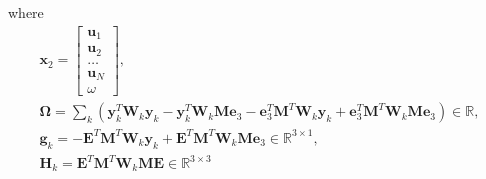 \documentclass{article}
\begin{document}
where
\begin{align}
    \mathbf{x}_2 = \begin{bmatrix} \mathbf{u}_1 \\ \mathbf{u}_2 \\ \dots \\ \mathbf{u}_N \\ \omega \end{bmatrix}, \\
    \mathbf{\Omega} = \sum_k \left( \mathbf{y}_k^T \mathbf{W}_k \mathbf{y}_k - \mathbf{y}_k^T \mathbf{W}_k \mathbf{M} \mathbf{e}_3 - \mathbf{e}_3^T \mathbf{M}^T \mathbf{W}_k \mathbf{y}_k + \mathbf{e}_3^T \mathbf{M}^T \mathbf{W}_k \mathbf{M} \mathbf{e}_3 \right) \in \mathbb{R}, \\
    \mathbf{g}_k = -\mathbf{E}^T\mathbf{M}^T\mathbf{W}_k\mathbf{y}_k + \mathbf{E}^T\mathbf{M}^T\mathbf{W}_k\mathbf{M}\mathbf{e}_3  \in \mathbb{R}^{3 \times 1}, \\
    \mathbf{H}_k = \mathbf{E}^T \mathbf{M}^T \mathbf{W}_k \mathbf{M} \mathbf{E} \in \mathbb{R}^{3 \times 3}
\end{align}
\end{document}
